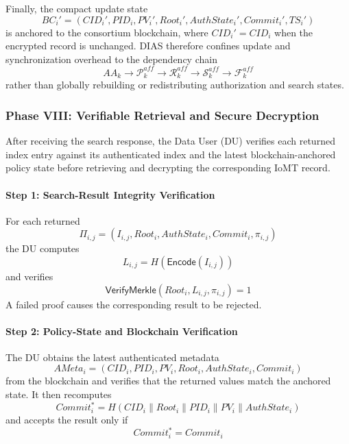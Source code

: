 \documentclass{ieeetj}
\theoremstyle{ieee-style}
\begin{document}
Finally, the compact update state
\begin{equation}
BC_i'
=
(CID_i',PID_i,PV_i',Root_i',AuthState_i',Commit_i',TS_i')
\label{eq:update-anchor}
\end{equation}
is anchored to the consortium blockchain, where $CID_i'=CID_i$ when
the encrypted record is unchanged. DIAS therefore confines update and
synchronization overhead to the dependency chain
\begin{equation}
AA_k
\rightarrow
\mathcal{P}_k^{aff}
\rightarrow
\mathcal{R}_k^{aff}
\rightarrow
\mathcal{S}_k^{aff}
\rightarrow
\mathcal{F}_k^{aff}
\label{eq:dias-dependency-chain}
\end{equation}
rather than globally rebuilding or redistributing authorization and
search states.


\subsubsection*{\textbf{Phase VIII: Verifiable Retrieval and Secure Decryption}}

After receiving the search response, the Data User (DU) verifies each
returned index entry against its authenticated index and the latest
blockchain-anchored policy state before retrieving and decrypting the
corresponding IoMT record.

\paragraph*{Step 1: Search-Result Integrity Verification}

For each returned
\begin{equation}
\Pi_{i,j}
=
(I_{i,j},Root_i,AuthState_i,Commit_i,\pi_{i,j})
\end{equation}
the DU computes
\begin{equation}
L_{i,j}
=
H\!\left(\mathsf{Encode}(I_{i,j})\right)
\end{equation}
and verifies
\begin{equation}
\mathsf{VerifyMerkle}(Root_i,L_{i,j},\pi_{i,j})=1
\label{eq:result-verification}
\end{equation}
A failed proof causes the corresponding result to be rejected.

\paragraph*{Step 2: Policy-State and Blockchain Verification}

The DU obtains the latest authenticated metadata
\begin{equation}
AMeta_i=
(CID_i,PID_i,PV_i,Root_i,AuthState_i,Commit_i)
\end{equation}
from the blockchain and verifies that the returned values match the
anchored state. It then recomputes
\begin{equation}
Commit_i^*
=
H\!\left(
CID_i\parallel Root_i\parallel PID_i
\parallel PV_i\parallel AuthState_i
\right)
\end{equation}
and accepts the result only if
\begin{equation}
Commit_i^*=Commit_i
\end{equation}
\end{document}
